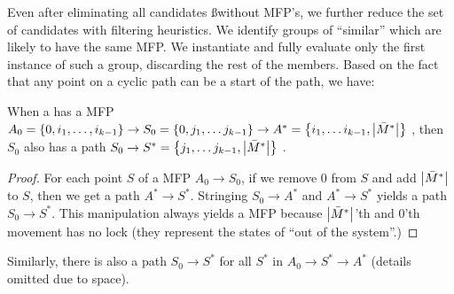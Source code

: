 Even after eliminating all candidates \ss without MFP's,%
we further reduce the set of candidates with filtering heuristics.
We identify groups of ``similar'' \sss which are likely to have the same MFP.
We instantiate and fully evaluate only the first instance of such a group, discarding the rest of the members.
%
Based on the fact that %
any point on a cyclic path can be a start of the path, we have:
\begin{theo}
When a \msss has a MFP 
$A_0 = \left\{0,i_1,\ldots,i_{k-1}\right\}
 \rightarrow S_0=\left\{0,j_1,\ldots j_{k-1}\right\}
 \rightarrow A^*=\left\{i_1,\ldots i_{k-1},\left|\bar{M}^*\right|\right\}$ ,
then $S_0$ also has a path
 $S_0 \rightarrow S^*=\left\{j_1,\ldots j_{k-1},\left|\bar{M}^*\right|\right\}$ .
\end{theo}
\begin{proof}
For each point $S$ of a MFP $A_0 \rightarrow S_0$,
if we remove $0$ from $S$ and add $\left|\bar{M}^*\right|$ to $S$,
then we get a path $A^* \rightarrow S^*$.
Stringing $S_0 \rightarrow A^*$ and $A^* \rightarrow S^*$ yields a
path $S_0 \rightarrow S^*$.
This manipulation always yields a MFP because 
$\left|\bar{M}^*\right|$'th and $0$'th movement has no lock
(they represent the states of ``out of the system''.)
\end{proof}

Similarly, there is also a path $S_0 \rightarrow S^*$ for all $S^*$ in
$A_0 \rightarrow S^*\rightarrow A^*$  (details omitted due to space).


